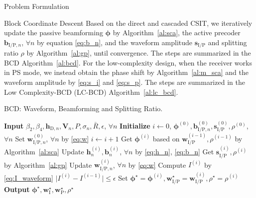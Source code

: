 \documentclass[journal]{IEEEtran}
\begin{document}
\begin{section}{Problem Formulation}
		\begin{subsection}{Block Coordinate Descent}
			Based on the direct and cascaded CSIT, we iteratively update the passive beamforming $\boldsymbol{\phi}$ by Algorithm~\ref{al:sca}, the active precoder $\boldsymbol{b}_{\mathrm{I/P},n}$, $\forall n$ by equation \eqref{eq:b_n}, and the waveform amplitude $\boldsymbol{s}_{\mathrm{I/P}}$ and splitting ratio $\rho$ by Algorithm~\ref{al:gp}, until convergence. The steps are summarized in the BCD Algorithm~\ref{al:bcd}. For the low-complexity design, when the receiver works in PS mode, we instead obtain the phase shift by Algorithm~\ref{al:m_sca} and the waveform amplitude by \eqref{eq:s_i} and \eqref{eq:s_p}. The steps are summarized in the Low Complexity-BCD (LC-BCD) Algorithm~\ref{al:lc_bcd}.
			\begin{algorithm}[!t]
				\caption{BCD: Waveform, Beamforming and Splitting Ratio.}
				\label{al:bcd}
				\begin{algorithmic}[1]
					\State \textbf{Input} $\beta_2,\beta_4,\boldsymbol{h}_{\mathrm{D},n},\boldsymbol{V}_{n},P,\sigma_n,\bar{R},\epsilon$, $\forall n$
					\State \textbf{Initialize} $i \gets 0$, $\boldsymbol{\phi}^{(0)},\boldsymbol{b}_{\mathrm{I/P},n}^{(0)},\boldsymbol{s}_{\mathrm{I/P}}^{(0)},\rho^{(0)}$, $\forall n$
					\State Set $\boldsymbol{w}_{\mathrm{I/P},n}^{(0)}$, $\forall n$ by \eqref{eq:w}
					\Repeat
						\State $i \gets i + 1$
						\State Get $\boldsymbol{\phi}^{(i)}$ based on $\boldsymbol{w}_{\mathrm{I/P}}^{(i-1)},\rho^{(i-1)}$ by Algorithm~\ref{al:sca}
						\State Update $\boldsymbol{h}_n^{(i)},\boldsymbol{b}_n^{(i)}$, $\forall n$ by \eqref{eq:h_n}, \eqref{eq:b_n}
						\State Get $\boldsymbol{s}_{\mathrm{I/P}}^{(i)},\rho^{(i)}$ by Algorithm~\ref{al:gp}
						\State Update $\boldsymbol{w}_{\mathrm{I/P},n}^{(i)}$, $\forall n$ by \eqref{eq:w}
						\State Compute $I^{(i)}$ by \eqref{eq:I_waveform}
					\Until $\lvert I^{(i)} - I^{(i-1)} \rvert \le \epsilon$
					\State Set $\boldsymbol{\phi}^{\star}=\boldsymbol{\phi}^{(i)},\boldsymbol{w}_{\mathrm{I/P}}^{\star}=\boldsymbol{w}_{\mathrm{I/P}}^{(i)},\rho^{\star}=\rho^{(i)}$
					\State \textbf{Output} $\boldsymbol{\phi}^{\star},\boldsymbol{w}_{\mathrm{I}}^{\star},\boldsymbol{w}_{\mathrm{P}}^{\star},\rho^{\star}$
				\end{algorithmic}
			\end{algorithm}


\end{subsection}
\end{section}
\end{document}
